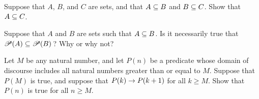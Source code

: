 \begin{exercises}
\problem\label{E-subtrans} Suppose that $A$, $B$, and $C$ are sets, and that
$A\subseteq B$ and $B\subseteq C$.  Show that $A\subseteq C$.

\problem Suppose that $A$ and $B$ are sets such that $A\subseteq B$.
Is it necessarily true that ${\mathscr P}(A)\subseteq {\mathscr P}(B)\,$?
Why or why not?


\problem Let $M$ be any natural number, and let $P(n)$ be a
predicate whose domain of discourse includes all natural numbers
greater than or equal to $M$.  Suppose that $P(M)$ is true,
and suppose that $P(k)\rightarrow P(k+1)$ for all $k\ge M$.
Show that $P(n)$ is true for all $n\ge M$.


\end{exercises}





